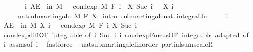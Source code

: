\begin{isabellebody}
\ \ \ \ \ \ \ {\isachardoublequoteopen}{\isasymAnd}i{\isachardot}{\kern0pt}\ AE\ {\isasymxi}\ in\ M{\isachardot}{\kern0pt}\ {}\ {\isasymle}\ cond{\isacharunderscore}{\kern0pt}exp\ M\ {\isacharparenleft}{\kern0pt}F\ i{\isacharparenright}{\kern0pt}\ {\isacharparenleft}{\kern0pt}{\isasymlambda}{\isasymxi}{\isachardot}{\kern0pt}\ X\ {\isacharparenleft}{\kern0pt}Suc\ i{\isacharparenright}{\kern0pt}\ {\isasymxi}\ {\isacharminus}{\kern0pt}\ X\ i\ {\isasymxi}{\isacharparenright}{\kern0pt}\ {\isasymxi}{\isachardoublequoteclose}\ \isanewline
\ \ \ \ \ {\isachardoublequoteopen}nat{\isacharunderscore}{\kern0pt}submartingale\ M\ F\ X{\isachardoublequoteclose}\isanewline
%
\isadelimproof
%
\endisadelimproof
%
\isatagproof
{}\isamarkupfalse%
\ {\isacharparenleft}{\kern0pt}intro\ submartingale{\isacharunderscore}{\kern0pt}nat\ integrable{\isacharparenright}{\kern0pt}\ \isanewline
\ \ \isamarkupfalse%
\ i\ \isanewline
\ \ \isamarkupfalse%
\ {\isachardoublequoteopen}AE\ {\isasymxi}\ in\ M{\isachardot}{\kern0pt}\ X\ i\ {\isasymxi}\ {\isasymle}\ cond{\isacharunderscore}{\kern0pt}exp\ M\ {\isacharparenleft}{\kern0pt}F\ i{\isacharparenright}{\kern0pt}\ {\isacharparenleft}{\kern0pt}X\ {\isacharparenleft}{\kern0pt}Suc\ i{\isacharparenright}{\kern0pt}{\isacharparenright}{\kern0pt}\ {\isasymxi}{\isachardoublequoteclose}\ \isamarkupfalse%
\ cond{\isacharunderscore}{\kern0pt}exp{\isacharunderscore}{\kern0pt}diff{\isacharbrackleft}{\kern0pt}OF\ integrable{\isacharparenleft}{\kern0pt}{}{\isacharcomma}{\kern0pt}{}{\isacharparenright}{\kern0pt}{\isacharcomma}{\kern0pt}\ of\ i\ {\isachardoublequoteopen}Suc\ i{\isachardoublequoteclose}\ i{\isacharbrackright}{\kern0pt}\ cond{\isacharunderscore}{\kern0pt}exp{\isacharunderscore}{\kern0pt}F{\isacharunderscore}{\kern0pt}meas{\isacharbrackleft}{\kern0pt}OF\ integrable\ adapted{\isacharcomma}{\kern0pt}\ of\ i{\isacharbrackright}{\kern0pt}\ assms{\isacharparenleft}{\kern0pt}{}{\isacharparenright}{\kern0pt}{\isacharbrackleft}{\kern0pt}of\ i{\isacharbrackright}{\kern0pt}\ \isamarkupfalse%
\ fastforce\isanewline
{}\isamarkupfalse%
%
\endisatagproof
{\isafoldproof}%
%
\isadelimproof
\isanewline
%
\endisadelimproof
\isanewline
{}\isamarkupfalse%
\ {\isacharparenleft}{\kern0pt}\ nat{\isacharunderscore}{\kern0pt}submartingale{\isacharunderscore}{\kern0pt}linorder{\isacharparenright}{\kern0pt}\ partial{\isacharunderscore}{\kern0pt}sum{\isacharunderscore}{\kern0pt}scaleR{\isacharcolon}{\kern0pt}\isanewline

\end{isabellebody}
